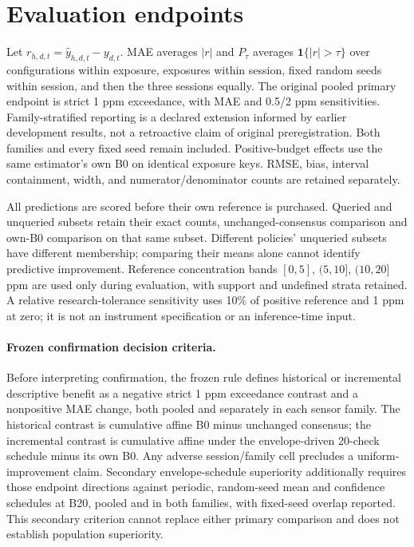 \section{Evaluation endpoints}\label{sec:evaluation}
Let $r_{h,d,t}=\widehat y_{h,d,t}-y_{d,t}$. MAE averages $|r|$ and $P_\tau$ averages $\mathbf1\{|r|>\tau\}$ over configurations within exposure, exposures within session, fixed random seeds within session, and then the three sessions equally. The original pooled primary endpoint is strict 1 ppm exceedance, with MAE and 0.5/2 ppm sensitivities. Family-stratified reporting is a declared extension informed by earlier development results, not a retroactive claim of original preregistration. Both families and every fixed seed remain included. Positive-budget effects use the same estimator's own B0 on identical exposure keys. RMSE, bias, interval containment, width, and numerator/denominator counts are retained separately.

All predictions are scored before their own reference is purchased. Queried and unqueried subsets retain their exact counts, unchanged-consensus comparison and own-B0 comparison on that same subset. Different policies' unqueried subsets have different membership; comparing their means alone cannot identify predictive improvement. Reference concentration bands $[0,5]$, $(5,10]$, $(10,20]$ ppm are used only during evaluation, with support and undefined strata retained. A relative research-tolerance sensitivity uses 10\% of positive reference and 1 ppm at zero; it is not an instrument specification or an inference-time input.

\paragraph{Frozen confirmation decision criteria.}
Before interpreting confirmation, the frozen rule defines historical or incremental descriptive benefit as a negative strict 1 ppm exceedance contrast and a nonpositive MAE change, both pooled and separately in each sensor family. The historical contrast is cumulative affine B0 minus unchanged consensus; the incremental contrast is cumulative affine under the envelope-driven 20-check schedule minus its own B0. Any adverse session/family cell precludes a uniform-improvement claim. Secondary envelope-schedule superiority additionally requires those endpoint directions against periodic, random-seed mean and confidence schedules at B20, pooled and in both families, with fixed-seed overlap reported. This secondary criterion cannot replace either primary comparison and does not establish population superiority.


